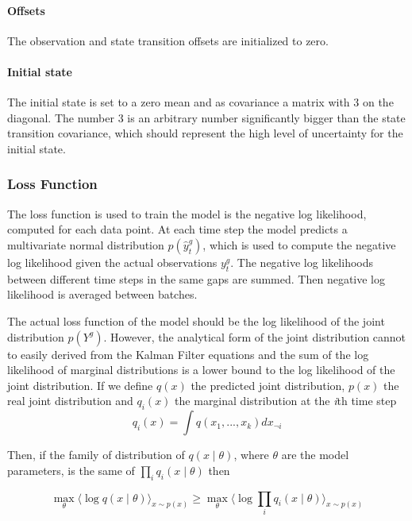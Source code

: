 \documentclass{article}
\newcommand{\E}[1]{\langle #1 \rangle} %
\begin{document}
\paragraph{Offsets} The observation and state transition offsets are initialized to zero.

\paragraph{Initial state} The initial state is set to a zero mean and as covariance a matrix with 3 on the diagonal. The number 3 is an arbitrary number significantly bigger than the state transition covariance, which should represent the high level of uncertainty for the initial state.  

\subsubsection{Loss Function}

The loss function is used to train the model is the negative log likelihood, computed for each data point. At each time step the model predicts a multivariate normal distribution $p(\hat{y}^g_t)$, which is used to compute the negative log likelihood given the actual observations $y_t^g$. The negative log likelihoods between different time steps in the same gaps are summed. Then negative log likelihood is averaged between batches.

The actual loss function of the model should be the log likelihood of the joint distribution $p(Y^g)$. However, the analytical form of the joint distribution cannot to easily derived from the Kalman Filter equations and the sum of the log likelihood of marginal distributions is a lower bound to the log likelihood of the joint distribution. If we define $q(x)$ the predicted joint distribution, $p(x)$ the real joint distribution and $q_i(x)$ the marginal distribution at the \textit{i}th time step
\begin{equation}
    q_i(x) = \int q(x_1, ..., x_k)dx_{\neg i}
\end{equation}

Then, if the family of distribution of $q(x \mid \theta)$, where $\theta$ are the model parameters, is the same of $\prod_i q_i(x \mid \theta)$ then

\begin{equation}\label{eq:log_joint_geq}
    \max_\theta \E{\log q(x\mid \theta)}_{x \sim p(x)} \geq \max_\theta \E{\log \prod_i q_i(x\mid \theta)}_{x \sim p(x)}
\end{equation}
\end{document}

